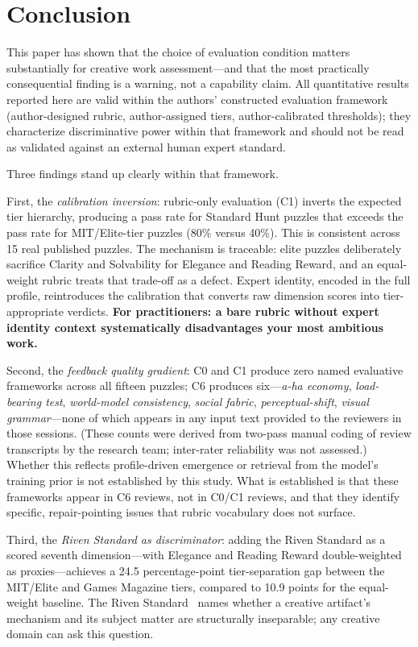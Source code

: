 \section{Conclusion}
\label{sec:conclusion}

This paper has shown that the choice of evaluation condition matters substantially for
creative work assessment---and that the most practically consequential finding is a warning,
not a capability claim. All quantitative results reported here are valid within the authors'
constructed evaluation framework (author-designed rubric, author-assigned tiers,
author-calibrated thresholds); they characterize discriminative power within that framework
and should not be read as validated against an external human expert standard.

Three findings stand up clearly within that framework.

First, the \emph{calibration inversion}: rubric-only evaluation (C1) inverts the expected
tier hierarchy, producing a pass rate for Standard Hunt puzzles that exceeds the pass rate
for MIT/Elite-tier puzzles (80\% versus 40\%). This is consistent across 15 real published
puzzles. The mechanism is traceable: elite puzzles deliberately sacrifice Clarity and
Solvability for Elegance and Reading Reward, and an equal-weight rubric treats that
trade-off as a defect. Expert identity, encoded in the full profile, reintroduces the
calibration that converts raw dimension scores into tier-appropriate verdicts.
\textbf{For practitioners: a bare rubric without expert identity context systematically
disadvantages your most ambitious work.}

Second, the \emph{feedback quality gradient}: C0 and C1 produce zero named evaluative
frameworks across all fifteen puzzles; C6 produces six---\emph{a-ha economy},
\emph{load-bearing test}, \emph{world-model consistency}, \emph{social fabric},
\emph{perceptual-shift}, \emph{visual grammar}---none of which appears in any input text
provided to the reviewers in those sessions.
(These counts were derived from two-pass manual coding of review transcripts by the research team; inter-rater reliability was not assessed.) Whether this reflects profile-driven emergence
or retrieval from the model's training prior is not established by this study. What is
established is that these frameworks appear in C6 reviews, not in C0/C1 reviews, and that
they identify specific, repair-pointing issues that rubric vocabulary does not surface.

Third, the \emph{Riven Standard as discriminator}: adding the Riven Standard as a scored
seventh dimension---with Elegance and Reading Reward double-weighted as proxies---achieves
a 24.5 percentage-point tier-separation gap between the MIT/Elite and Games Magazine tiers,
compared to 10.9 points for the equal-weight baseline. The Riven Standard~\cite{miller2016riven}
names whether a creative artifact's mechanism and its subject matter are structurally
inseparable; any creative domain can ask this question.


